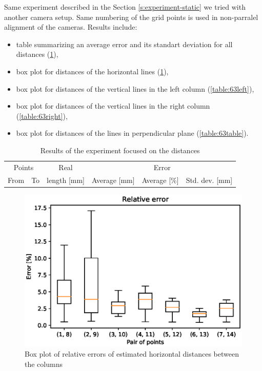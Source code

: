 Same experiment described in the Section \ref{s:experiment-static} we tried
with another camera setup. Same numbering of the grid points is used in
non-parralel alignment of the cameras.
\newline
Results include:
\begin{itemize}
\item table summarizing an average error and its standart deviation for all distances (\ref{table:63}),
\item box plot for distances of the horizontal lines (\ref{table:63horizontal}),
\item box plot for distances of the vertical lines in the left column (\ref{table:63left}),
\item box plot for distances of the vertical lines in the right column (\ref{table:63right}),
\item box plot for distances of the lines in perpendicular plane (\ref{table:63table}).
\end{itemize}

\begin{table}
\centering
\begin{tabular}{|r|r|r|r|r|r|}
\hline
\multicolumn{2}{|c|}{Points} & \multicolumn{1}{c|}{Real} & \multicolumn{3}{c|}{Error} \\
\cline{1-2} \cline{4-6}
From & To & length [mm] & Average [mm] & Average [\%] & Std. dev. [mm]\\
\hline
\hline

\hline
\end{tabular}
\caption{Results of the experiment focused on the distances}
\label{table:63}
\end{table}

\begin{figure}
\includegraphics[width=\linewidth]{experiments/63/horizontal.eps}
\caption{Box plot of relative errors of estimated horizontal distances between the columns}
\label{table:63horizontal}
\end{figure}

